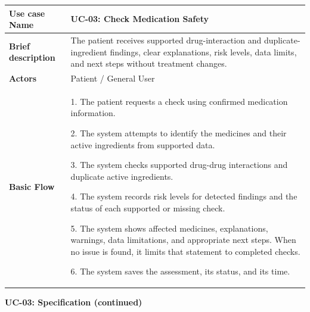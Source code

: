 \begin{longtable}{|p{}|p{}|}
\hline
\textbf{Use case Name} & UC-03: Check Medication Safety \\ \hline
\textbf{Brief description} & The patient receives supported drug-interaction and duplicate-ingredient findings, clear explanations, risk levels, data limits, and next steps without treatment changes. \\ \hline
\textbf{Actors} & Patient / General User \\ \hline
\textbf{Basic Flow} &
1. The patient requests a check using confirmed medication information.\par
2. The system attempts to identify the medicines and their active ingredients from supported data.\par
3. The system checks supported drug-drug interactions and duplicate active ingredients.\par
4. The system records risk levels for detected findings and the status of each supported or missing check.\par
5. The system shows affected medicines, explanations, warnings, data limitations, and appropriate next steps. When no issue is found, it limits that statement to completed checks.\par
6. The system saves the assessment, its status, and its time.
\\ \hline
\end{longtable}
\clearpage
\noindent\textbf{UC-03: Specification (continued)}
